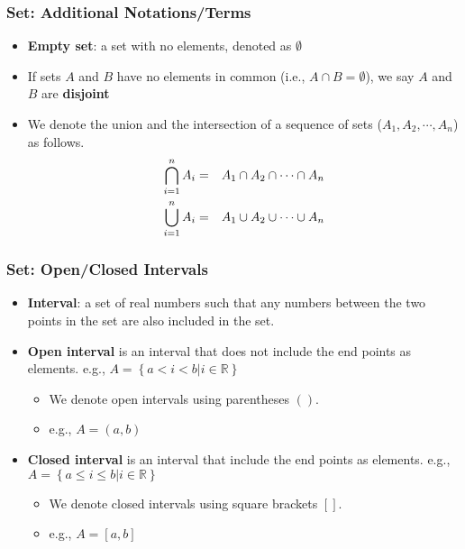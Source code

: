 \documentclass[pdflatex, 12pt]{beamer}
\newcommand{\R}{\mathbb{R}}
\begin{document}
\begin{frame}
\frametitle{Set: Additional Notations/Terms}
\begin{itemize}
\item \textbf{Empty set}: a set with no elements, denoted as $\emptyset$
\vspace{0.4cm}
\item If sets $A$ and $B$ have no elements in common (i.e., $A \cap B = \emptyset$), we say $A$ and $B$ are \textbf{disjoint}
\vspace{0.4cm}
\item We denote the union and the intersection of a sequence of sets ($A_1, A_2, \cdots, A_n$) as follows.
 \begin{eqnarray}
 \bigcap_{i = 1}^{n} A_i &=& A_1 \cap A_2 \cap \cdots \cap A_n \notag \\
 \bigcup_{i = 1}^{n} A_i &=& A_1 \cup A_2 \cup \cdots \cup A_n \notag 
 \end{eqnarray}
\end{itemize}
\end{frame}

\begin{frame}
\frametitle{Set: Open/Closed Intervals}
\begin{itemize}
\item \textbf{Interval}: a set of real numbers such that any numbers between the two points in the set are also included in the set.
\vspace{0.4cm}
\item \textbf{Open interval} is an interval that does not include the end points as elements. e.g., $A = \left\{a < i < b| i \in \R\right\}$
 \begin{itemize}
 \item We denote open intervals using parentheses $()$.
 \item e.g., $A = (a, b)$
 \end{itemize}
\vspace{0.4cm}
\item \textbf{Closed interval} is an interval that include the end points as elements. e.g., $A = \left\{a \leq i \leq b| i \in \R\right\}$
 \begin{itemize}
 \item We denote closed intervals using square brackets $[]$.
 \item e.g., $A = [a, b]$
 \end{itemize}
\end{itemize}
\end{frame}
\end{document}
